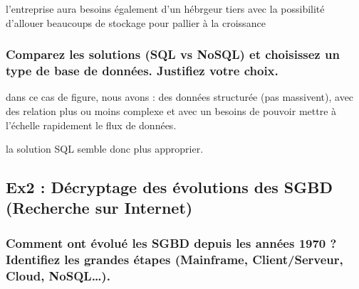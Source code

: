 \documentclass{article}
\begin{document}
l'entreprise aura besoins également d'un hébrgeur tiers avec la possibilité d'allouer beaucoups de stockage pour pallier à la croissance 

\subsubsection{Comparez les solutions (SQL vs NoSQL) et choisissez un type de base de données. Justifiez votre 
choix.}
dans ce cas de figure, nous avons :
des données structurée (pas massivent), avec des relation plus ou moins complexe et avec un besoins de pouvoir mettre à l'échelle rapidement le flux de données.

la solution SQL semble donc plus approprier. 

\subsection{Ex2 : Décryptage des évolutions des SGBD (Recherche sur Internet)}
\subsubsection{Comment ont évolué les SGBD depuis les années 1970 ? Identifiez les grandes étapes (Mainframe, 
Client/Serveur, Cloud, NoSQL…).}
\end{document}
